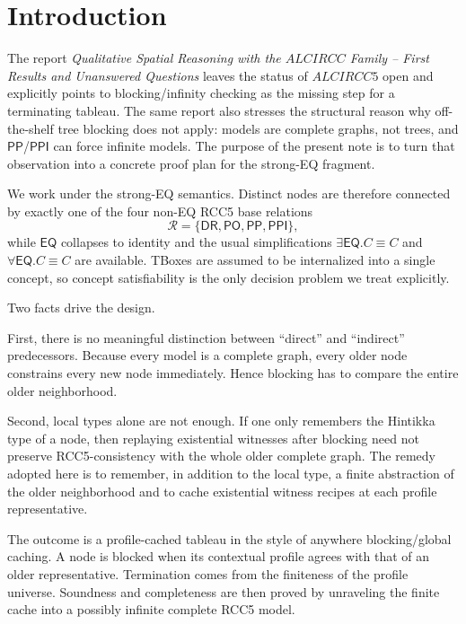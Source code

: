 \documentclass[11pt]{article}
\theoremstyle{definition}
\newcommand{\Roles}{\mathcal{R}}
\newcommand{\DR}{\mathsf{DR}}
\newcommand{\PO}{\mathsf{PO}}
\newcommand{\PP}{\mathsf{PP}}
\newcommand{\PPI}{\mathsf{PPI}}
\newcommand{\EQ}{\mathsf{EQ}}
\begin{document}
\section{Introduction}

The report \emph{Qualitative Spatial Reasoning with the $ALCIRCC$ Family -- First Results and Unanswered Questions} leaves the status of $ALCIRCC5$ open and explicitly points to blocking/infinity checking as the missing step for a terminating tableau. The same report also stresses the structural reason why off-the-shelf tree blocking does not apply: models are complete graphs, not trees, and $\PP$/$\PPI$ can force infinite models. The purpose of the present note is to turn that observation into a concrete proof plan for the strong-EQ fragment.

We work under the strong-EQ semantics. Distinct nodes are therefore connected by exactly one of the four non-EQ RCC5 base relations
\[
\Roles = \{\DR,\PO,\PP,\PPI\},
\]
while $\EQ$ collapses to identity and the usual simplifications $\exists \EQ.C \equiv C$ and $\forall \EQ.C \equiv C$ are available. TBoxes are assumed to be internalized into a single concept, so concept satisfiability is the only decision problem we treat explicitly.

Two facts drive the design.

First, there is no meaningful distinction between ``direct'' and ``indirect'' predecessors. Because every model is a complete graph, every older node constrains every new node immediately. Hence blocking has to compare the entire older neighborhood.

Second, local types alone are not enough. If one only remembers the Hintikka type of a node, then replaying existential witnesses after blocking need not preserve RCC5-consistency with the whole older complete graph. The remedy adopted here is to remember, in addition to the local type, a finite abstraction of the older neighborhood and to cache existential witness recipes at each profile representative.

The outcome is a profile-cached tableau in the style of anywhere blocking/global caching. A node is blocked when its contextual profile agrees with that of an older representative. Termination comes from the finiteness of the profile universe. Soundness and completeness are then proved by unraveling the finite cache into a possibly infinite complete RCC5 model.
\end{document}
